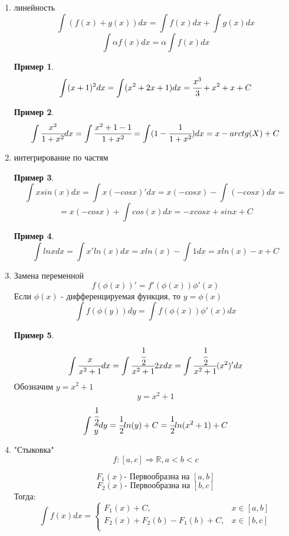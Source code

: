 \documentclass[a4paper]{article}
\theoremstyle{definition}
\newtheorem*{exmp}{Пример}
\newtheorem*{comment}{Замечание}
\numberwithin{theorem}{subsection}
\numberwithin{lemma}{subsection}
\numberwithin{definition}{subsection}
\numberwithin{comment*}{subsection}
\numberwithin{consequence}{subsection}
\numberwithin{property}{subsection}
\begin{document}
\begin{enumerate}
 \item линейность
       $$ \int (f(x) + g(x))dx = \int f(x)dx + \int g(x)dx$$
       $$ \int \alpha f(x) dx = \alpha \int f(x)dx$$
       \begin{exmp}
        $$ \int (x+1)^2 dx = \int (x^2 + 2x + 1)dx = \cfrac{x^3}{3} + x^2 + x + C $$
       \end{exmp}
       \begin{exmp}
        $$ \int \cfrac{x^2}{1+x^2} dx = \int \cfrac{x^2 + 1 -1}{1+x^2} = \int (1 - \cfrac{1}{1+x^2})dx = x - arctg(X) + C $$
       \end{exmp}
 \item интегрирование по частям

       \begin{exmp}
        $$ \int x sin(x) dx = \int x (-cosx)'dx = x(-cosx) - \int (-cosx)dx =$$
        $$= x(-cosx) + \int cos(x)dx=-xcosx + sinx + C$$
       \end{exmp}
       \begin{exmp}
        $$ \int lnx dx = \int x' ln(x) dx = x ln(x) - \int 1 dx = x ln(x) -x + C$$
       \end{exmp}
 \item Замена переменной
       $$f(\phi(x))'= f'(\phi(x))\phi'(x)$$
       Если $\phi(x)$ - дифференцируемая функция, то $y = \phi(x)$
       $$ \int f(\phi(y))dy = \int f(\phi(x))\phi'(x)dx$$
       \begin{exmp}
        $$ \int \cfrac{x}{x^2+1} dx = \int \cfrac{\cfrac{1}{2}}{x^2+1} 2x dx = \int \cfrac{\cfrac{1}{2}}{x^2+1} (x^2)' dx$$
        Обозначим $y = x^2 + 1$
        $$ y = x^2 + 1  $$
        $$ \int  \cfrac{\cfrac{1}{2}}{y}dy = \cfrac{1}{2}ln(y) + C = \cfrac{1}{2}ln(x^2 + 1) + C$$
       \end{exmp}
 \item "Стыковка"
       $$f:[a,c] \Rightarrow \mathbb{R}, a<b<c$$

       $$ F_1(x) \text{- Первообразна на }[a,b]$$
       $$ F_2(x) \text{- Первообразна на }[b,c]$$
       Тогда:
       $$ \int f(x) dx = \begin{cases}
         F_1(x) + C,               & x\in [a,b] \\
         F_2(x) + F_2(b)-F_1(b)+C, & x\in [b,c] \\
        \end{cases}$$
\end{enumerate}
\end{document}
